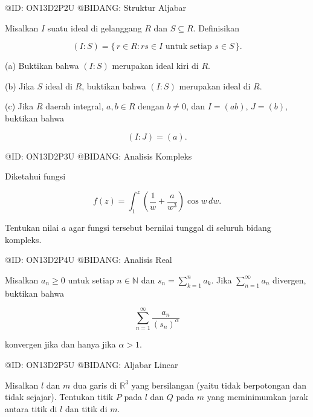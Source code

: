 @ID: ON13D2P2U
@BIDANG: Struktur Aljabar

Misalkan $I$ suatu ideal di gelanggang $R$ dan $S\subseteq R$. Definisikan

$$
(I:S)=\{\,r\in R:rs\in I\text{ untuk setiap }s\in S\,\}.
$$

(a) Buktikan bahwa $(I:S)$ merupakan ideal kiri di $R$.

(b) Jika $S$ ideal di $R$, buktikan bahwa $(I:S)$ merupakan ideal di $R$.

(c) Jika $R$ daerah integral, $a,b\in R$ dengan $b\ne0$, dan $I=(ab)$, $J=(b)$, buktikan bahwa

$$
(I:J)=(a).
$$

@ID: ON13D2P3U
@BIDANG: Analisis Kompleks

Diketahui fungsi

$$
f(z)
=
\int_1^z
\left(
\frac1w+\frac{a}{w^3}
\right)
\cos w\,dw.
$$

Tentukan nilai $a$ agar fungsi tersebut bernilai tunggal di seluruh bidang kompleks.

@ID: ON13D2P4U
@BIDANG: Analisis Real

Misalkan $a_n\ge0$ untuk setiap $n\in\mathbb N$ dan $s_n=\sum_{k=1}^n a_k$. Jika $\sum_{n=1}^\infty a_n$ divergen, buktikan bahwa

$$
\sum_{n=1}^\infty
\frac{a_n}{(s_n)^\alpha}
$$

konvergen jika dan hanya jika $\alpha>1$.

@ID: ON13D2P5U
@BIDANG: Aljabar Linear

Misalkan $l$ dan $m$ dua garis di $\mathbb R^3$ yang bersilangan (yaitu tidak berpotongan dan tidak sejajar). Tentukan titik $P$ pada $l$ dan $Q$ pada $m$ yang meminimumkan jarak antara titik di $l$ dan titik di $m$.